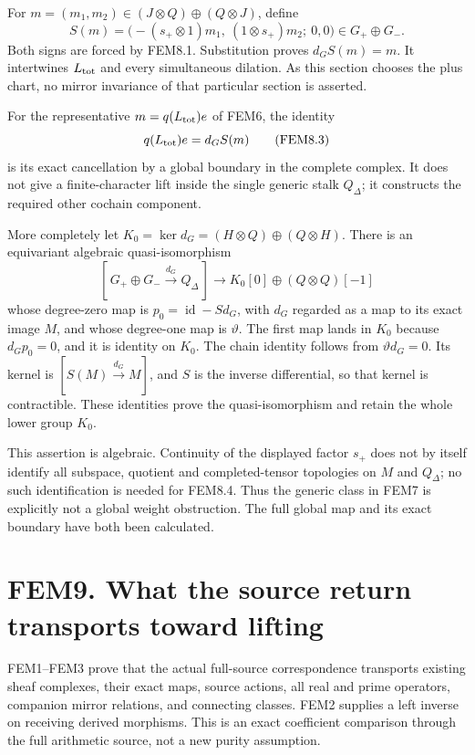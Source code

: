 For \(m=(m_1,m_2)\in(J\otimes Q)\oplus(Q\otimes J)\), define \[
S(m)=
\bigl(- (s_+\otimes1)m_1,\ (1\otimes s_+)m_2;\ 0,0\bigr)
\in G_+\oplus G_- .
\tag{FEM8.2}
\] Both signs are forced by FEM8.1. Substitution proves \(d_GS(m)=m\).
It intertwines \(L_{\rm tot}\) and every simultaneous dilation. As this
section chooses the plus chart, no mirror invariance of that particular
section is asserted.

For the representative \(m=q(L_{\rm tot})e\) of FEM6, the identity \[
q(L_{\rm tot})e=d_GS(m)
\tag{FEM8.3}
\] is its exact cancellation by a global boundary in the complete
complex. It does not give a finite-character lift inside the single
generic stalk \(Q_\Delta\); it constructs the required other cochain
component.

More completely let \(K_0=\ker d_G=(H\otimes Q)\oplus(Q\otimes H)\).
There is an equivariant algebraic quasi-isomorphism \[
[\,G_+\oplus G_-\xrightarrow{d_G}Q_\Delta\,]
 \longrightarrow K_0[0]\oplus(Q\otimes Q)[-1]
\tag{FEM8.4}
\] whose degree-zero map is \(p_0=\operatorname{id}-Sd_G\), with \(d_G\)
regarded as a map to its exact image \(M\), and whose degree-one map is
\(\vartheta\). The first map lands in \(K_0\) because \(d_Gp_0=0\), and
it is identity on \(K_0\). The chain identity follows from
\(\vartheta d_G=0\). Its kernel is \([S(M)\xrightarrow{d_G}M]\), and
\(S\) is the inverse differential, so that kernel is contractible. These
identities prove the quasi-isomorphism and retain the whole lower group
\(K_0\).

This assertion is algebraic. Continuity of the displayed factor \(s_+\)
does not by itself identify all subspace, quotient and completed-tensor
topologies on \(M\) and \(Q_\Delta\); no such identification is needed
for FEM8.4. Thus the generic class in FEM7 is explicitly not a global
weight obstruction. The full global map and its exact boundary have both
been calculated.

\section{FEM9. What the source return transports toward
lifting}\label{fem9.-what-the-source-return-transports-toward-lifting}

FEM1--FEM3 prove that the actual full-source correspondence transports
existing sheaf complexes, their exact maps, source actions, all real and
prime operators, companion mirror relations, and connecting classes.
FEM2 supplies a left inverse on receiving derived morphisms. This is an
exact coefficient comparison through the full arithmetic source, not a
new purity assumption.

